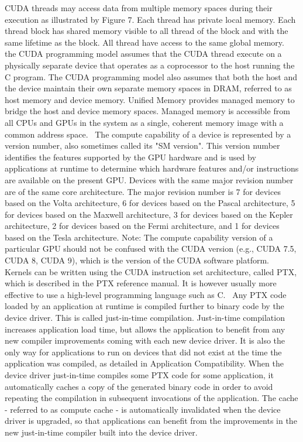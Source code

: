\documentclass[openany]{book}
\begin{document}
CUDA threads may access data from multiple memory spaces during their execution as illustrated by Figure 7. Each thread has private local memory. Each thread block has shared memory visible to all thread of the block and with the same lifetime as the block. All thread have access to the same global memory.~\cite[p.~2.3]{CUDA18}
the CUDA programming model assumes that the CUDA thread execute on a physically separate device that operates as a coprocessor to the host running the C program. The CUDA programming model also assumes that both the host and the device maintain their own separate memory spaces in DRAM, referred to as host memory and device memory. Unified Memory provides managed memory to bridge the host and device memory spaces. Managed memory is accessible from all CPUs and GPUs in the system as a single, coherent memory image with a common address space.~\cite[p.~2.4]{CUDA18}
The compute capability of a device is represented by a version number, also sometimes called its "SM version". This version number identifies the features supported by the GPU hardware and is used by applications at runtime to determine which hardware features and/or instructions are available on the present GPU. Devices with the same major revision number are of the same core architecture. The major revision number is 7 for devices based on the Volta architecture, 6 for devices based on the Pascal architecture, 5 for devices based on the Maxwell architecture, 3 for devices based on the Kepler architecture, 2 for devices based on the Fermi architecture, and 1 for devices based on the Tesla architecture. Note: The compute capability version of a particular GPU should not be confused with the CUDA version (e.g., CUDA 7.5, CUDA 8, CUDA 9), which is the version of the CUDA software platform.~\cite[p.~2.4]{CUDA18}
Kernels can be written using the CUDA instruction set architecture, called PTX, which is described in the PTX reference manual. It is however usually more effective to use a high-level programming language such as C.~\cite[p.~3.1]{CUDA18}
Any PTX code loaded by an application at runtime is compiled further to binary code by the device driver. This is called just-in-time compilation. Just-in-time compilation increases application load time, but allows the application to benefit from any new compiler improvements coming with each new device driver. It is also the only way for applications to run on devices that did not exist at the time the application was compiled, as detailed in Application Compatibility. When the device driver just-in-time compiles some PTX code for some application, it automatically caches a copy of the generated binary code in order to avoid repeating the compilation in subsequent invocations of the application. The cache - referred to as compute cache - is automatically invalidated when the device driver is upgraded, so that applications can benefit from the improvements in the new just-in-time compiler built into the device driver.~\cite[p.~3.1.1.2]{CUDA18}
\end{document}
